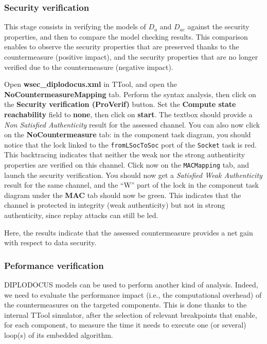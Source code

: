 \documentclass{article}
\begin{document}
\subsubsection{Security verification}

This stage consists in verifying the models of $D_a$ and $D_{a c}$ against the security properties, and then to compare the model checking results. This comparison enables to observe the security properties that are preserved thanks to the countermeasure (positive impact), and the security properties that are no longer verified due to the countermeasure (negative impact).

Open \textbf{wsec\_diplodocus.xml} in TTool, and open the \textbf{NoCountermeasureMapping} tab. Perform the syntax analysis, then click on the \textbf{Security verification (ProVerif)} button. Set the \textbf{Compute state reachability} field to \textbf{none}, then click on \textbf{start}. The textbox should provide a \emph{Non Satisfied Authenticity} result for the assessed channel. You can also now click on the \textbf{NoCountermeasure} tab: in the component task diagram, you should notice that the lock linked to the \texttt{fromLSocToSoc} port of the \texttt{Socket} task is red. This backtracing indicates that neither the weak nor the strong authenticity properties are verified on this channel. Click now on the \texttt{MACMapping} tab, and launch the security verification. You should now get a \emph{Satisfied Weak Authenticity} result for the same channel, and the ``W'' part of the lock in the component task diagram under the \textbf{MAC} tab should now be green. This indicates that the channel is protected in integrity (weak authenticity) but not in strong authenticity, since replay attacks can still be led.

Here, the results indicate that the assessed countermeasure provides a net gain with respect to data security.

\subsubsection{Peformance verification}

DIPLODOCUS models can be used to perform another kind of analysis. Indeed, we need to evaluate the performance impact (i.e., the computational overhead) of the countermeasures on the targeted components. This is done thanks to the internal TTool simulator, after the selection of relevant breakpoints that enable, for each component, to measure the time it needs to execute one (or several) loop(s) of its embedded algorithm.
\end{document}
